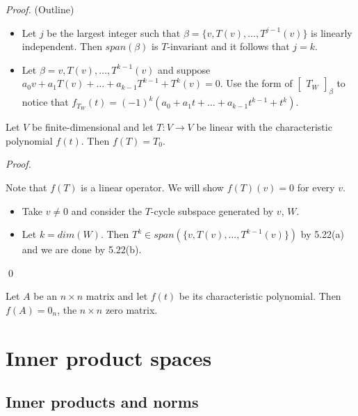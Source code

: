 \documentclass[12pt]{article}
\newenvironment{theorem}[2][Theorem]{\begin{trivlist}
\item[\hskip \labelsep {\bfseries #1}\hskip \labelsep {\bfseries #2.}]}{\end{trivlist}}
\newenvironment{corollary}[2][Corollary]{\begin{trivlist}
\item[\hskip \labelsep {\bfseries #1}\hskip \labelsep {\bfseries #2}]}{\end{trivlist}}
\newenvironment{sol}
    {\emph{Proof.}
    }
    {
    \qed
    }
\begin{document}
\textit{Proof.} (Outline)
\begin{itemize}
    \item[(a)] Let $j$ be the largest integer such that $\beta = \{v, T(v), \dots, T^{j - 1}(v)\}$ is linearly independent. Then $span(\beta)$ is $T$-invariant and it follows that $j = k$.
    
    \item[(b)] Let $\beta = v, T(v), \dots, T^{k - 1}(v)$ and suppose $a_0v + a_1T(v) + \dots + a_{k - 1}T^{k-1} + T^k(v) = 0$. Use the form of $\begin{bmatrix}
    T_W
    \end{bmatrix}_\beta$ to notice that $f_{T_W}(t) = (-1)^k(a_0 + a_1t + \dots + a_{k-1}t^{k-1} + t^k)$.
\end{itemize}

\begin{theorem}{5.23, Cayley-Hamilton}
Let $V$ be finite-dimensional and let $T : V \to V$ be linear with the characteristic polynomial $f(t)$. Then $f(T) = T_0$.
\end{theorem}

\begin{sol}
Note that $f(T)$ is a linear operator. We will show $f(T)(v) = 0$ for every $v$.

\begin{itemize}
    \item Take $v \neq 0$ and consider the $T$-cycle subspace generated by $v$, $W$.
    
    \item Let $k = dim(W)$. Then $T^k \in span(\{v, T(v), \dots, T^{k-1}(v)\})$ by 5.22(a) and we are done by 5.22(b).
\end{itemize}
\end{sol}

\begin{corollary}{15}
Let $A$ be an $n \times n$ matrix and let $f(t)$ be its characteristic polynomial. Then $f(A) = 0_n$, the $n \times n$ zero matrix.
\end{corollary}

\section{Inner product spaces}

\subsection{Inner products and norms}
\end{document}
